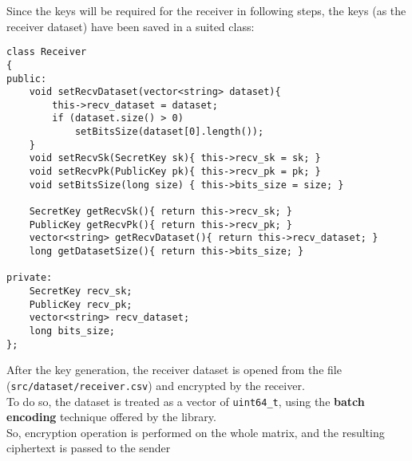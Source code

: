 \documentclass[12pt]{extarticle}
\begin{document}
Since the keys will be required for the receiver in following steps, the keys (as the receiver dataset) have been saved in a suited class:
\newpage
\begin{lstlisting}
class Receiver
{
public:
	void setRecvDataset(vector<string> dataset){ 
		this->recv_dataset = dataset;
		if (dataset.size() > 0)
			setBitsSize(dataset[0].length());
	}
	void setRecvSk(SecretKey sk){ this->recv_sk = sk; } 
	void setRecvPk(PublicKey pk){ this->recv_pk = pk; }
	void setBitsSize(long size) { this->bits_size = size; }
	
	SecretKey getRecvSk(){ return this->recv_sk; } 
	PublicKey getRecvPk(){ return this->recv_pk; } 
	vector<string> getRecvDataset(){ return this->recv_dataset; }
	long getDatasetSize(){ return this->bits_size; }

private:
	SecretKey recv_sk;
	PublicKey recv_pk;
	vector<string> recv_dataset;
	long bits_size;
};
\end{lstlisting}
After the key generation, the receiver dataset is opened from the file (\texttt{src/dataset/receiver.csv}) and encrypted by the receiver.\\To do so, the dataset is treated as a vector of \texttt{uint64\_t}, using the \textbf{batch encoding} technique offered by the library.\\
So, encryption operation is performed on the whole matrix, and the resulting ciphertext is passed to the sender
\end{document}
